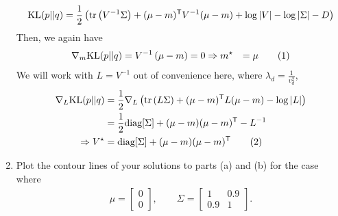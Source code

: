\documentclass[11pt]{article}
\newcommand{\inv}{{-1}}
\newcommand{\numberthis}{\addtocounter{equation}{1}\tag{\theequation}}
\begin{document}
\begin{enumerate}[label=(\alph*)]
\begin{solution}
    \begin{equation*}
        \textrm{KL}(p||q) = \frac{1}{2}\left(
            \textrm{tr} \left(V^\inv \Sigma \right)
            + (\mu - m)^\trans V^\inv (\mu - m)
            +\log |V| - \log |\Sigma| - D
        \right)
    \end{equation*}
Then, we again have
    \begin{align*}
       \nabla_m \textrm{KL}(p||q)
            &= V^\inv\left(\mu - m \right) = 0
        \Rightarrow m^\star &= \mu \numberthis
    \end{align*}
We will work with $L = V^\inv$ out of convenience here, where $\lambda_d = \frac{1}{v_d^2}$,
    \begin{align*}
        \nabla_L \textrm{KL}(p||q)
            &= \frac{1}{2} \nabla_L \left( \textrm{tr} \left(L \Sigma \right) 
                + (\mu - m)^\trans L (\mu - m)
                - \log |L|\right) \\
            &= \frac{1}{2} \textrm{diag}[\Sigma]
                + (\mu-m)(\mu-m)^\trans
                - L^\inv \\
        \Rightarrow V^\star &= \textrm{diag}[\Sigma]
                + (\mu-m)(\mu-m)^\trans \numberthis
    \end{align*}
    
\end{solution}

    
    \item Plot the contour lines of your solutions to parts (a) and (b) for the case where
    \begin{align*}
        \mu = \begin{bmatrix}0 \\ 0 \end{bmatrix}, \qquad
        \Sigma = \begin{bmatrix} 1 & 0.9 \\ 0.9 & 1 \end{bmatrix}.
    \end{align*}


\end{enumerate}
\end{document}
